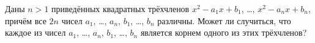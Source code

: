 \begin{problems}
\item
Даны $n > 1$ приведённых квадратных трёхчленов
$x^{2} - a_{1} x + b_{1}$, \ldots, $x^{2} - a_{n} x + b_{n}$,
причём все $2n$ чисел
$a_{1}$, \ldots, $a_{n}$, $b_{1}$, \ldots, $b_{n}$
различны.
Может ли случиться, что каждое из чисел
$a_{1}$, \ldots, $a_{n}$, $b_{1}$, \ldots, $b_{n}$
является корнем одного из этих трёхчленов?

\end{problems}

